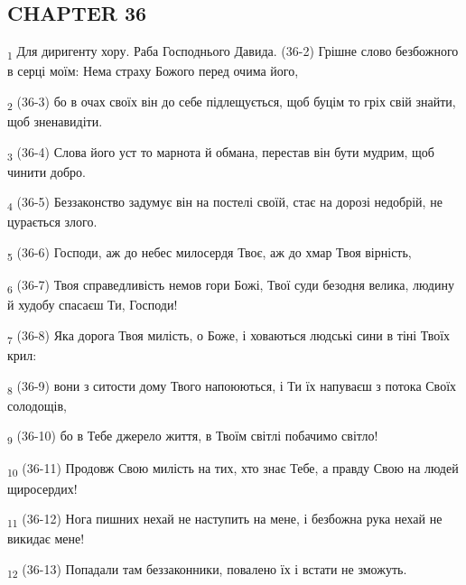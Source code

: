 \subsection{CHAPTER 36}
\begin{tcolorbox}
\textsubscript{1} Для диригенту хору. Раба Господнього Давида. (36-2) Грішне слово безбожного в серці моїм: Нема страху Божого перед очима його,
\end{tcolorbox}
\begin{tcolorbox}
\textsubscript{2} (36-3) бо в очах своїх він до себе підлещується, щоб буцім то гріх свій знайти, щоб зненавидіти.
\end{tcolorbox}
\begin{tcolorbox}
\textsubscript{3} (36-4) Слова його уст то марнота й обмана, перестав він бути мудрим, щоб чинити добро.
\end{tcolorbox}
\begin{tcolorbox}
\textsubscript{4} (36-5) Беззаконство задумує він на постелі своїй, стає на дорозі недобрій, не цурається злого.
\end{tcolorbox}
\begin{tcolorbox}
\textsubscript{5} (36-6) Господи, аж до небес милосердя Твоє, аж до хмар Твоя вірність,
\end{tcolorbox}
\begin{tcolorbox}
\textsubscript{6} (36-7) Твоя справедливість немов гори Божі, Твої суди безодня велика, людину й худобу спасаєш Ти, Господи!
\end{tcolorbox}
\begin{tcolorbox}
\textsubscript{7} (36-8) Яка дорога Твоя милість, о Боже, і ховаються людські сини в тіні Твоїх крил:
\end{tcolorbox}
\begin{tcolorbox}
\textsubscript{8} (36-9) вони з ситости дому Твого напоюються, і Ти їх напуваєш з потока Своїх солодощів,
\end{tcolorbox}
\begin{tcolorbox}
\textsubscript{9} (36-10) бо в Тебе джерело життя, в Твоїм світлі побачимо світло!
\end{tcolorbox}
\begin{tcolorbox}
\textsubscript{10} (36-11) Продовж Свою милість на тих, хто знає Тебе, а правду Свою на людей щиросердих!
\end{tcolorbox}
\begin{tcolorbox}
\textsubscript{11} (36-12) Нога пишних нехай не наступить на мене, і безбожна рука нехай не викидає мене!
\end{tcolorbox}
\begin{tcolorbox}
\textsubscript{12} (36-13) Попадали там беззаконники, повалено їх і встати не зможуть.
\end{tcolorbox}
